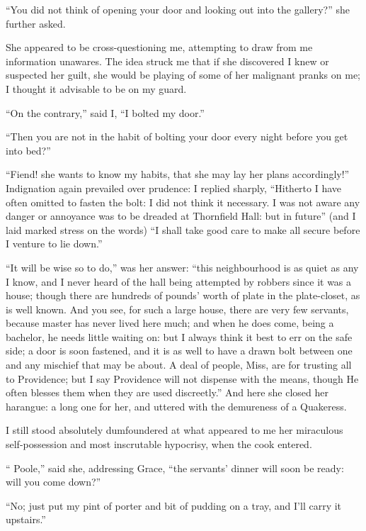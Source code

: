 \enquote{You did not think of opening your door and looking out into the
	gallery?} she further asked.

She appeared to be cross-questioning me, attempting to draw from me
information unawares.  The idea struck me that if she discovered I knew
or suspected her guilt, she would be playing of some of her malignant
pranks on me; I thought it advisable to be on my guard.

\enquote{On the contrary,} said I, \enquote{I bolted my door.}

\enquote{Then you are not in the habit of bolting your door every night
	before you get into bed?}

\enquote{Fiend! she wants to know my habits, that she may lay her plans
	accordingly!}  Indignation again prevailed over prudence: I replied
sharply, \enquote{Hitherto I have often omitted to fasten the bolt: I
	did not think it necessary.  I was not aware any danger or annoyance was
	to be dreaded at Thornfield Hall: but in future} (and I laid marked
stress on the words) \enquote{I shall take good care to make all secure
	before I venture to lie down.}

\enquote{It will be wise so to do,} was her answer: \enquote{this
	neighbourhood is as quiet as any I know, and I never heard of the hall
	being attempted by robbers since it was a house; though there are
	hundreds of pounds' worth of plate in the plate-closet, as is well
	known.  And you see, for such a large house, there are very few
	servants, because master has never lived here much; and when he does
	come, being a bachelor, he needs little waiting on: but I always think
	it best to err on the safe side; a door is soon fastened, and it is as
	well to have a drawn bolt between one and any mischief that may be
	about.  A deal of people, Miss, are for trusting all to Providence; but
	I say Providence will not dispense with the means, though He often
	blesses them when they are used discreetly.}  And here she closed her
harangue: a long one for her, and uttered with the demureness of a
Quakeress.

I still stood absolutely dumfoundered at what appeared to me her
miraculous self-possession and most inscrutable hypocrisy, when the cook
entered.

\enquote{\Mrs{} Poole,} said she, addressing Grace, \enquote{the servants'
	dinner will soon be ready: will you come down?}

\enquote{No; just put my pint of porter and bit of pudding on a tray,
	and I'll carry it upstairs.}

